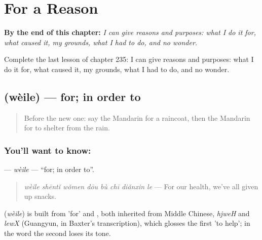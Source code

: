 
\chapter{For a Reason}
\label{ch:zh-for-a-reason}

\begin{chapteropening}
\textbf{By the end of this chapter:} \emph{I can give reasons and purposes: what I do it for, what caused it, my grounds, what I had to do, and no wonder.}

Complete the last lesson of chapter 235: I can give reasons and purposes: what I do it for, what caused it, my grounds, what I had to do, and no wonder.
\end{chapteropening}

\section[\texorpdfstring{\zh{为了} (wèile)}{为了 (wèile)}]{ (wèile) — for; in order to}

\label{lesson:ZH-C235-weile}



\begin{quote}
Before the new one: say the Mandarin for a raincoat, then the Mandarin for to shelter from the rain.
\end{quote}

\subsection*{You'll want to know: }
\textbf{} — \emph{wèile} — \textquotedblleft{}for; in order to\textquotedblright{}.

\begin{quote}
\textbf{} \emph{wèile shēntǐ wǒmen dōu bù chī diǎnxin le} — For our health, we've all given up snacks.
\end{quote}

\begin{cousinweb}
\textbf{} (\emph{wèile}) is built from  'for' and , both inherited from Middle Chinese, \emph{hjweH} and \emph{lewX} (Guangyun, in Baxter's transcription), which glosses the first 'to help'; in the word the second loses its tone.
\end{cousinweb}

